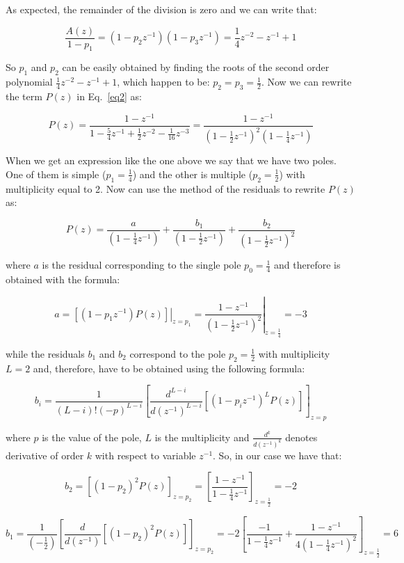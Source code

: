 \documentclass[a4paper,12pt,oneside]{article}
\begin{document}
As expected, the remainder of the division is zero and we can write that:

\[
\frac{A(z)}{1-p_1}=(1-p_{2}z^{-1})(1-p_{3}z^{-1})=\frac{1}{4}z^{-2}-z^{-1}+1
\]

So $p_1$ and $p_2$ can be easily obtained by finding the roots of the second order polynomial $\frac{1}{4}z^{-2}-z^{-1}+1$, which happen to be: $p_2=p_3=\frac{1}{2}$. Now we can rewrite the term $P(z)$ in Eq.~\ref{eq2} as:

\[
P(z)=\frac{1-z^{-1}}{1-\frac{5}{4}z^{-1}+\frac{1}{2}z^{-2}-\frac{1}{16}z^{-3}}=\frac{1-z^{-1}}{(1-\frac{1}{2}z^{-1})^2(1-\frac{1}{4}z^{-1})}
\]

When we get an expression like the one above we say that we have two poles. One of them is simple ($p_1=\frac{1}{4}$) and the other is multiple ($p_{2}=\frac{1}{2}$) with multiplicity equal to 2. Now can use the method of the residuals to rewrite $P(z)$ as:

\begin{equation}\label{fractionalexp}
P(z)=\frac{a}{(1-\frac{1}{4}z^{-1})}+\frac{b_1}{(1-\frac{1}{2}z^{-1})}+\frac{b_2}{(1-\frac{1}{2}z^{-1})^2}
\end{equation}

where $a$ is the residual corresponding to the single pole $p_0=\frac{1}{4}$ and therefore is obtained with the formula:

\[
a = \left.\left[(1-p_1z^{-1})P(z)\right]\right|_{z=p_1}=\left.\frac{1-z^{-1}}{(1-\frac{1}{2}z^{-1})^2}\right|_{z=\frac{1}{4}}=-3
\]

while the residuals $b_{1}$ and $b_{2}$ correspond to the pole $p_2=\frac{1}{2}$ with multiplicity $L=2$ and, therefore, have to be obtained using the following formula:

\[
b_{i} = \frac{1}{(L-i)!(-p)^{L-i}}\left[\frac{d^{L-i}}{d(z^{-1})^{L-i}}\left[(1-p_iz^{-1})^LP(z)\right]\right]_{z=p}
\]

where $p$ is the value of the pole, $L$ is the multiplicity and $\frac{d^k}{d(z^{-1})^k}$ denotes derivative of order $k$ with respect to variable $z^{-1}$. So, in our case we have that:

\[
b_2=\left[(1-p_2)^2P(z)\right]_{z=p_2}=\left[\frac{1-z^{-1}}{1-\frac{1}{4}z^{-1}}\right]_{z=\frac{1}{2}}=-2
\]

\[
b_1=\frac{1}{(-\frac{1}{2})}\left[\frac{d}{d(z^{-1})}\left[(1-p_2)^2P(z)\right]\right]_{z=p_2}=-2\left[\frac{-1}{1-\frac{1}{4}z^{-1}}+\frac{1-z^{-1}}{4(1-\frac{1}{4}z^{-1})^2}\right]_{z=\frac{1}{2}}=6
\]
\end{document}
